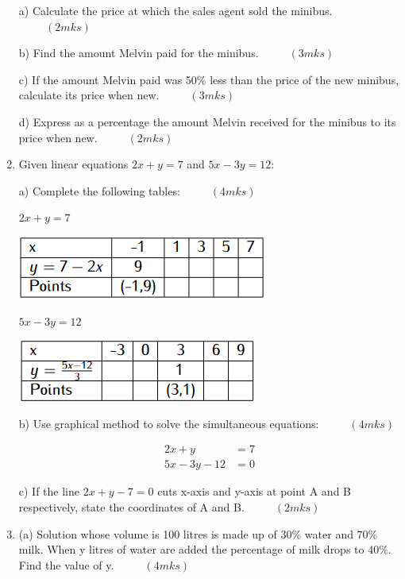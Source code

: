 \documentclass[
  a4paperpaper,
]{scrbook}
\begin{document}
\begin{tcolorbox}
\begin{enumerate}
  a) Calculate the price at which the sales agent sold the minibus.
  \(\hspace{1cm} (2mks)\)

  b) Find the amount Melvin paid for the minibus.
  \(\hspace{1cm} (3mks)\)

  c) If the amount Melvin paid was 50\% less than the price of the new
  minibus, calculate its price when new. \(\hspace{1cm} (3mks)\)

  d) Express as a percentage the amount Melvin received for the minibus
  to its price when new. \(\hspace{1cm} (2mks)\)
\item
  Given linear equations \(2x+y=7\) and \(5x-3y=12\):

  a) Complete the following tables: \(\hspace{1cm} (4mks)\)

  \(2x+y=7\)

  \includegraphics{figures/Md9_Q18a.png}

  \(5x-3y=12\)

  \includegraphics{figures/Md9_Q18b.png}

  b) Use graphical method to solve the simultaneous equations:
  \(\hspace{1cm}(4mks)\)

  \[
  \begin {split}
  2x+y&=7\\
  5x-3y-12&=0
  \end{split}
  \]

  c) If the line \(2x+y-7=0\) cuts x-axis and y-axis at point A and B
  respectively, state the coordinates of A and B.
  \(\hspace{1cm} (2mks)\)
\item
  (a) Solution whose volume is 100 litres is made up of \(30\%\) water
  and \(70\%\) milk. When y litres of water are added the percentage of
  milk drops to \(40\%\). Find the value of y. \(\hspace{1cm} (4mks)\)


\end{enumerate}
\end{tcolorbox}
\end{document}
